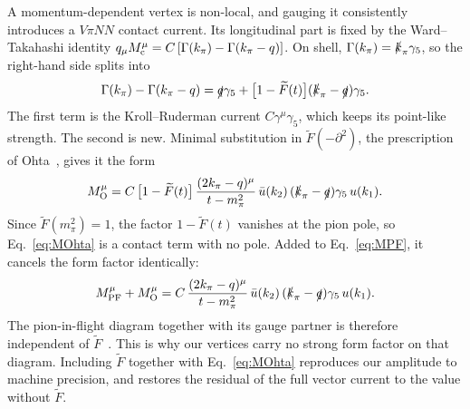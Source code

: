 A momentum-dependent vertex is non-local, and gauging it consistently
introduces a $V\pi NN$ contact current. Its longitudinal part is fixed by the
Ward--Takahashi identity
$q_\mu M^\mu_{\rm c} = C\,[\Gamma(k_\pi) - \Gamma(k_\pi - q)]$. On shell,
$\Gamma(k_\pi) = \slashed{k}_\pi\gamma_5$, so the right-hand side splits into
\begin{equation}
  \Gamma(k_\pi) - \Gamma(k_\pi - q)
  = \slashed{q}\gamma_5
  + \bigl[1 - \widetilde F(t)\bigr](\slashed{k}_\pi - \slashed{q})\gamma_5 .
\end{equation}
The first term is the Kroll--Ruderman current $C\gamma^\mu\gamma_5$, which keeps
its point-like strength. The second is new. Minimal substitution in
$\widetilde F(-\partial^2)$, the prescription of Ohta~\cite{Ohta:1989}, gives
it the form
\begin{equation}
  M^\mu_{\rm O} = C\,\bigl[1 - \widetilde F(t)\bigr]\,
  \frac{(2k_\pi - q)^\mu}{t - m_\pi^2}\,
  \bar u(k_2)\,(\slashed{k}_\pi - \slashed{q})\gamma_5\, u(k_1) .
  \label{eq:MOhta}
\end{equation}
Since $\widetilde F(m_\pi^2) = 1$, the factor $1 - \widetilde F(t)$ vanishes at
the pion pole, so Eq.~\eqref{eq:MOhta} is a contact term with no pole. Added to
Eq.~\eqref{eq:MPF}, it cancels the form factor identically:
\begin{equation}
  M^\mu_{\rm PF} + M^\mu_{\rm O}
  = C\,\frac{(2k_\pi - q)^\mu}{t - m_\pi^2}\,
  \bar u(k_2)\,(\slashed{k}_\pi - \slashed{q})\gamma_5\, u(k_1) .
\end{equation}
The pion-in-flight diagram together with its gauge partner is therefore
independent of $\widetilde F$~\cite{Workman:1992}. This is why our vertices
carry no strong form factor on that diagram. Including $\widetilde F$ together
with Eq.~\eqref{eq:MOhta} reproduces our amplitude to machine precision, and
restores the residual of the full vector current to the value without
$\widetilde F$.

